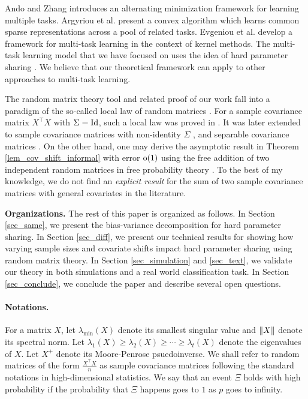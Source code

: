 Ando and Zhang \cite{AZ05} introduces an alternating minimization framework for learning multiple tasks.
Argyriou et al. \cite{AEP08} present a convex algorithm which learns common sparse representations across a pool of related tasks.
Evgeniou et al. \cite{EMP05} develop a framework for multi-task learning in the context of kernel methods.
The multi-task learning model that we have focused on uses the idea of hard parameter sharing \cite{C93,KD12,R17}.
We believe that our theoretical framework can apply to other approaches to multi-task learning.

The random matrix theory tool and related proof of our work fall into a paradigm of the so-called local law of random matrices \cite{erdos2017dynamical}.
For a sample covariance matrix $X^\top X$ with $\Sigma=\operatorname{Id}$, such a local law was proved in \cite{isotropic}.
It was later extended to sample covariance matrices with non-identity $\Sigma$ \cite{Anisotropic}, and separable covariance matrices \cite{yang2019spiked}. On the other hand, one may derive the asymptotic result in Theorem \ref{lem_cov_shift_informal} with error $\operatorname{o}(1)$ using the free addition of two independent random matrices in free probability theory \cite{nica2006lectures}. To the best of my knowledge, we do not find an {\it explicit result} for the sum of two sample covariance matrices with general covariates in the literature.

\smallskip
\noindent\textbf{Organizations.}
The rest of this paper is organized as follows.
In Section \ref{sec_same}, we present the bias-variance decomposition for hard parameter sharing.
In Section \ref{sec_diff}, we present our technical results for showing how varying sample sizes and covariate shifts impact hard parameter sharing using random matrix theory.
In Section \ref{sec_simulation} and \ref{sec_text}, we validate our theory in both simulations and a real world classification task.
In Section \ref{sec_conclude}, we conclude the paper and describe several open questions.

\paragraph{Notations.}
For a matrix $X$, let $\lambda_{\min}(X)$ denote its smallest singular value and $\|X\|$ denote its spectral norm.
Let $\lambda_1(X) \ge \lambda_2(X) \ge \cdots \ge \lambda_t(X)$ denote the eigenvalues of $X$.
Let $X^+$ denote its Moore-Penrose psuedoinverse.
We shall refer to random matrices of the form $\frac {X^\top X} n$ as sample covariance matrices following the standard notations in high-dimensional statistics.
We say that an event $\Xi$ holds with high probability if the probability that $\Xi$ happens goes to $1$ as $p$ goes to infinity.
